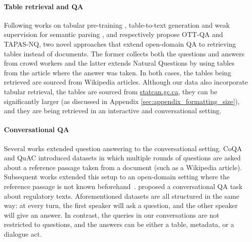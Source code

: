 \documentclass[11pt]{article}
\begin{document}
\paragraph{Table retrieval and QA}
Following works on tabular pre-training \citep{yin_tabert_2020}, table-to-text generation \citep{parikh-etal-2020-totto} and weak supervision for semantic parsing \citep{herzig_tapas_2020}, \citet{chen_open_2020} and \citet{herzig_open_2021} respectively propose OTT-QA and TAPAS-NQ, two novel approaches that extend open-domain QA to retrieving tables instead of documents. The former collects both the questions and answers from crowd workers and the latter extends Natural Questions by using tables from the article where the answer was taken. In both cases, the tables being retrieved are sourced from Wikipedia articles. Although our data also incorporate tabular retrieval, the tables are sourced from \href{https://www.statcan.gc.ca/}{statcan.gc.ca}, they can be significantly larger (as discussed in Appendix \ref{sec:appendix_formatting_size}), and they are being retrieved in an interactive and conversational setting.

\paragraph{Conversational QA}
Several works extended question answering to the conversational setting. CoQA \citep{reddy_coqa_2019} and QuAC \citep{choi_quac_2018} introduced datasets in which multiple rounds of questions are asked about a reference passage taken from a document (such as a Wikipedia article). Subsequent works extended this setup to an open-domain setting where the reference passage is not known beforehand~\cite{qu_open-retrieval_2020,anantha-etal-2021-open,adlakha_topiocqa_2022}. \citet{saeidi2018interpretation} proposed a conversational QA task about regulatory texts. Aforementioned datasets are all structured in the same way: at every turn, the first speaker will ask a question, and the other speaker will give an answer.  In contrast, the queries in our conversations are not restricted to questions, and the answers can be either a table, metadata, or a dialogue act. 
\end{document}
